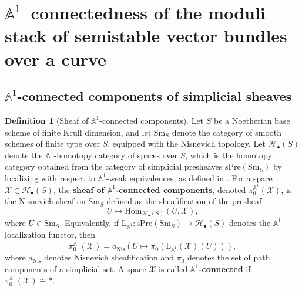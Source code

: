 \documentclass[12pt,reqno]{amsart}
\newcommand{\bb}[1]{\mathbb{#1}}
\theoremstyle{definition}
\newtheorem{definition}[theorem]{Definition}
\numberwithin{equation}{section}
\begin{document}
	\section{$\bb{A}^1$--connectedness of the moduli stack of semistable
		vector bundles over a curve}
	\label{section:a1-connectedness}
	
	\subsection{$\bb{A}^1$-connected components of simplicial sheaves}
	
	\begin{definition}[Sheaf of $\mathbb{A}^1$-connected components]
		\label{def:a1-connected-components}
		Let $S$ be a Noetherian base scheme of finite Krull dimension, and let
		$\mathrm{Sm}_S$ denote the category of smooth schemes of finite type over
		$S$, equipped with the Nisnevich topology. Let $\mathcal{H}_{\bullet}(S)$
		denote the $\mathbb{A}^1$-homotopy category of spaces over $S$, which is the
		homotopy category obtained from the category of simplicial presheaves
		$\mathrm{sPre}(\mathrm{Sm}_S)$ by localizing with respect to
		$\mathbb{A}^1$-weak equivalences, as defined in \cite{MV99}. For a space
		$\mathcal{X} \in \mathcal{H}_{\bullet}(S)$, the \textbf{sheaf of
			$\mathbb{A}^1$-connected components}, denoted $\pi_0^{\mathbb{A}^1}(\mathcal{X})$,
		is the Nisnevich sheaf on $\mathrm{Sm}_S$ defined as the sheafification of
		the presheaf
		\[
		U \longmapsto \mathrm{Hom}_{\mathcal{H}_{\bullet}(S)}(U, \mathcal{X}),
		\]
		where $U \in \mathrm{Sm}_S$. Equivalently, if
		$\mathrm{L}_{\mathbb{A}^1}: \mathrm{sPre}(\mathrm{Sm}_S) \to
		\mathcal{H}_{\bullet}(S)$ denotes the $\mathbb{A}^1$-localization functor,
		then
		\[
		\pi_0^{\mathbb{A}^1}(\mathcal{X}) = a_{\mathrm{Nis}}
		\!\left(U \mapsto \pi_0\!\left(\mathrm{L}_{\mathbb{A}^1}(\mathcal{X})(U)
		\right)\right),
		\]
		where $a_{\mathrm{Nis}}$ denotes Nisnevich sheafification and $\pi_0$
		denotes the set of path components of a simplicial set. A space $\mathcal{X}$
		is called \textbf{$\mathbb{A}^1$-connected} if
		$\pi_0^{\mathbb{A}^1}(\mathcal{X}) \cong *$.
	\end{definition}
	
\end{document}
